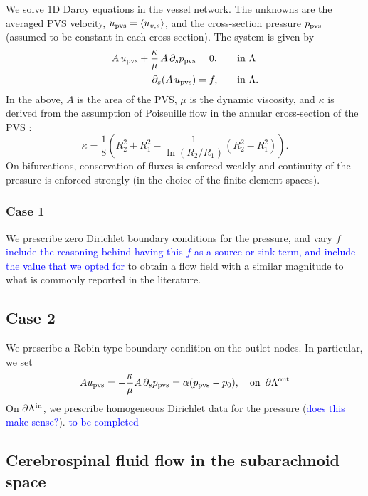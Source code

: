 \documentclass[fleqn,10pt]{wlscirep}
\newcommand{\rami}[1]{\textcolor{blue}{#1}}
\begin{document}
We solve 1D Darcy equations in the vessel network. The unknowns are the averaged PVS velocity, $u_{\rm pvs} = \langle u_{v,s} \rangle$, and the cross-section pressure $p_{\rm pvs} $ (assumed to be constant in each cross-section). The system is given by  \cite{daversin2022geometrically} 
\begin{alignat}{2}
A \,  u_{\rm pvs}   + \frac{\kappa}{\mu} \, A \, \partial_{s} p_{\rm pvs} & = 0, &&  \quad \rm in  \,\, \Lambda  \\ 
-\partial_s (A \, u_{\rm pvs}) & = f, && \quad \rm in  \,\, \Lambda .  
\end{alignat} 
In the above, $A$ is the area of the PVS, $\mu$ is the dynamic viscosity, and $\kappa$ is derived from the assumption of Poiseuille
flow in the annular cross-section of the PVS \cite{daversin2022geometrically,tithof2022network}: 
\begin{equation}
\kappa = \frac18 \left( R_2^2 + R_1^2 - \frac{1}{\ln(R_2/R_1)} (R_2^2- R_1^2) \right). 
\end{equation}
On bifurcations, conservation of fluxes is enforced weakly and continuity of the pressure is enforced strongly (in the choice of the finite element spaces). 

\subsubsection*{Case 1} We prescribe zero Dirichlet boundary conditions for the pressure, and vary $f$ \rami{include the reasoning behind having this $f$ as a source or sink term, and include the value that we opted for} to obtain a flow field with a similar magnitude to what is commonly reported in the literature.  

\subsection*{Case 2} We prescribe a Robin type boundary condition on the outlet nodes. In particular, we set 
\begin{equation}
A  u_{\rm pvs} =  - \frac{\kappa}{ \mu} A\, \partial_s p_{\rm pvs} = \alpha (p_{\rm pvs} - p_0), \quad  \rm on \,\,\, \partial \Lambda^{\rm out} 
\end{equation}
On $\partial \Lambda^{\rm in}$, we prescribe homogeneous Dirichlet data for the pressure (\rami{does this make sense?}). 
\rami{to be completed }

\subsection*{Cerebrospinal fluid flow in the subarachnoid space}
\end{document}

